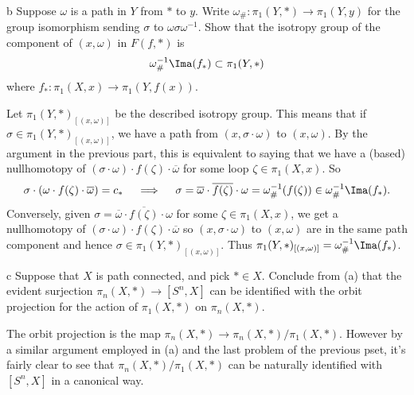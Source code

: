 \documentclass[11pt,letterpaper]{article}
\begin{document}
\begin{solution}
    \begin{partproblem}{b}
        Suppose $\omega$ is a path in $Y$ from $*$ to $y$. Write $\omega_\# : \pi_1(Y, *) \to \pi_1(Y, y)$ for the group isomorphism sending $\sigma$ to $\omega\sigma\omega^{-1}$. Show that the isotropy group of the component of $(x,\omega)$ in $F(f,*)$ is
        \[
            \omega^{-1}_\# \Ima(f_*) \subset \pi_1(Y, *)
        \]
        where $f_* : \pi_1(X,x) \to \pi_1(Y,f(x))$.
    \end{partproblem}
    \quad Let $\pi_1(Y,*)_{[(x,\omega)]}$ be the described isotropy group. This means that if $\sigma\in \pi_1(Y, *)_{[(x,\omega)]}$, we have a path from $(x,\sigma\cdot\omega)$ to $(x,\omega)$. By the argument in the previous part, this is equivalent to saying that we have a (based) nullhomotopy of $(\sigma\cdot \omega)\cdot f(\zeta)\cdot \overline{\omega}$ for some loop $\zeta\in\pi_1(X,x)$. So
    \[
        \sigma \cdot (\omega\cdot f(\zeta)\cdot \overline{\omega}) = c_* \quad\implies \quad \sigma = \overline{\omega}\cdot \overline{f(\zeta)} \cdot \omega = \omega^{-1}_\#(f(\zeta)) \in \omega^{-1}_\# \Ima(f_*)
    .\] 
    Conversely, given $\sigma = \overline{\omega}\cdot \overline{f(\zeta)}\cdot \omega$ for some $\zeta\in \pi_1(X,x)$, we get a nullhomotopy of $(\sigma\cdot \omega)\cdot f(\zeta)\cdot \overline{\omega}$ so $(x,\sigma\cdot\omega)$ to $(x,\omega)$ are in the same path component and hence $\sigma\in \pi_1(Y,*)_{[(x,\omega)]}$. Thus $\pi_1(Y,*)_{[(x,\omega)]} = \omega^{-1}_\# \Ima(f_*)$.  

    \begin{partproblem}{c}
        Suppose that $X$ is path connected, and pick $*\in X$. Conclude from (a) that the evident surjection $\pi_n(X, *) \to [S^n, X]$ can be identified with the orbit projection for the action of $\pi_1(X,*)$ on $\pi_n(X, *)$.
    \end{partproblem}

    \quad The orbit projection is the map $\pi_n(X, *) \to \pi_n(X, *) /\pi_1(X, *)$. However by a similar argument employed in (a) and the last problem of the previous pset, it's fairly clear to see that $\pi_n(X, *) / \pi_1(X,*)$ can be naturally identified with $[S^n, X]$ in a canonical way.
\end{solution}
\end{document}
